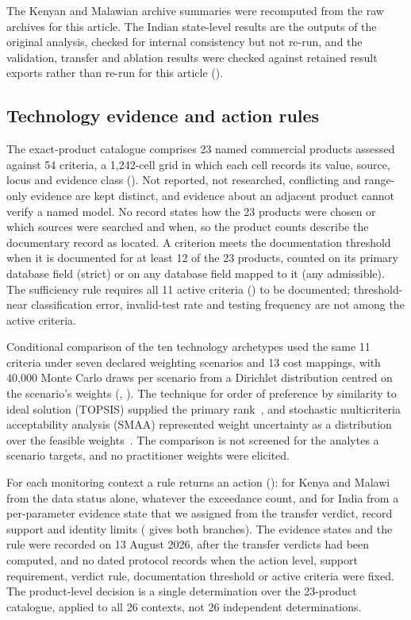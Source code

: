 \documentclass[10pt,letterpaper]{article}
\begin{document}
The Kenyan and Malawian archive summaries were recomputed from the raw archives for this article. The Indian state-level results are the outputs of the original analysis, checked for internal consistency but not re-run, and the validation, transfer and ablation results were checked against retained result exports rather than re-run for this article ().

\subsection*{Technology evidence and action rules}

The exact-product catalogue comprises 23 named commercial products assessed against 54 criteria, a 1,242-cell grid in which each cell records its value, source, locus and evidence class (). Not reported, not researched, conflicting and range-only evidence are kept distinct, and evidence about an adjacent product cannot verify a named model. No record states how the 23 products were chosen or which sources were searched and when, so the product counts describe the documentary record as located. A criterion meets the documentation threshold when it is documented for at least 12 of the 23 products, counted on its primary database field (strict) or on any database field mapped to it (any admissible). The sufficiency rule requires all 11 active criteria () to be documented; threshold-near classification error, invalid-test rate and testing frequency are not among the active criteria.

Conditional comparison of the ten technology archetypes used the same 11 criteria under seven declared weighting scenarios and 13 cost mappings, with 40,000 Monte Carlo draws per scenario from a Dirichlet distribution centred on the scenario's weights (, ). The technique for order of preference by similarity to ideal solution (TOPSIS) supplied the primary rank~\cite{Chakraborty2022}, and stochastic multicriteria acceptability analysis (SMAA) represented weight uncertainty as a distribution over the feasible weights~\cite{TervonenLahdelma2007}. The comparison is not screened for the analytes a scenario targets, and no practitioner weights were elicited.

For each monitoring context a rule returns an action (): for Kenya and Malawi from the data status alone, whatever the exceedance count, and for India from a per-parameter evidence state that we assigned from the transfer verdict, record support and identity limits ( gives both branches). The evidence states and the rule were recorded on 13 August 2026, after the transfer verdicts had been computed, and no dated protocol records when the action level, support requirement, verdict rule, documentation threshold or active criteria were fixed. The product-level decision is a single determination over the 23-product catalogue, applied to all 26 contexts, not 26 independent determinations.
\end{document}
